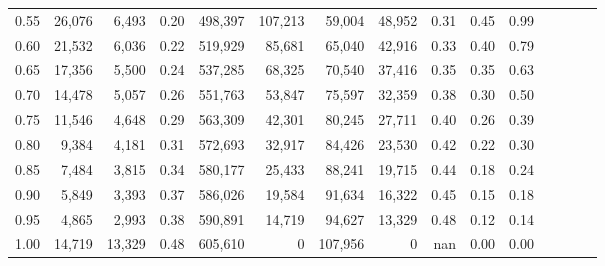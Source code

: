 \begin{tabular}{rrrcrrrrrrrrrrr}
0.55 &  26,076 &   6,493 &                                       0.20 &  498,397 &  107,213 &   59,004 &   48,952 &  0.31 &  0.45 &                         0.99 \\
0.60 &  21,532 &   6,036 &                                       0.22 &  519,929 &   85,681 &   65,040 &   42,916 &  0.33 &  0.40 &                         0.79 \\
0.65 &  17,356 &   5,500 &                                       0.24 &  537,285 &   68,325 &   70,540 &   37,416 &  0.35 &  0.35 &                         0.63 \\
0.70 &  14,478 &   5,057 &                                       0.26 &  551,763 &   53,847 &   75,597 &   32,359 &  0.38 &  0.30 &                         0.50 \\
0.75 &  11,546 &   4,648 &                                       0.29 &  563,309 &   42,301 &   80,245 &   27,711 &  0.40 &  0.26 &                         0.39 \\
0.80 &   9,384 &   4,181 &                                       0.31 &  572,693 &   32,917 &   84,426 &   23,530 &  0.42 &  0.22 &                         0.30 \\
0.85 &   7,484 &   3,815 &                                       0.34 &  580,177 &   25,433 &   88,241 &   19,715 &  0.44 &  0.18 &                         0.24 \\
0.90 &   5,849 &   3,393 &                                       0.37 &  586,026 &   19,584 &   91,634 &   16,322 &  0.45 &  0.15 &                         0.18 \\
0.95 &   4,865 &   2,993 &                                       0.38 &  590,891 &   14,719 &   94,627 &   13,329 &  0.48 &  0.12 &                         0.14 \\
1.00 &  14,719 &  13,329 &                                       0.48 &  605,610 &        0 &  107,956 &        0 &   nan &  0.00 &                         0.00 \\
\bottomrule
\end{tabular}
